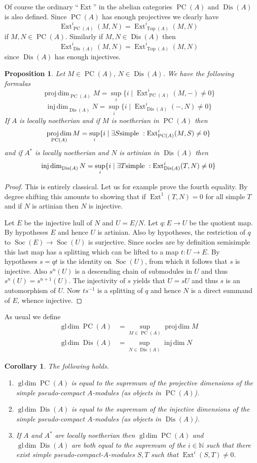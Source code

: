 \documentclass{amsproc}
\def \NN{{\mathbb N}}
\DeclareMathOperator{\Dis}{Dis}
\def\Ext{\operatorname {Ext}}
\def\gldim{\operatorname {gl\,dim}}
\def\injdim{\operatorname {inj\,dim}}
\def\r{\rightarrow}
\let\oldtext\text
\def\text#1{\oldtext{\upshape #1}}
\DeclareMathOperator{\PC}{PC}
\DeclareMathOperator{\Top}{Top}
\DeclareMathOperator{\projdim}{proj\,dim}
\DeclareMathOperator{\Soc}{Soc}
\newtheorem{proposition}[lemma]{Proposition}
\newtheorem{corollary}[lemma]{Corollary}
\theoremstyle{definition}
\theoremstyle{remark}
\numberwithin{equation}{section}
\numberwithin{table}{section}
\numberwithin{figure}{section}
\begin{document}
Of course the ordinary ``$\Ext$'' in the abelian categories $\PC(A)$
and $\Dis(A)$ is also defined. 
 Since $\PC(A)$ has enough projectives we
clearly have
\[
\Ext^i_{\PC(A)}(M,N)=\Ext^i_{\Top(A)}(M,N)
\]
if $M,N\in \PC(A)$. Similarly if $M,N\in \Dis(A)$ then 
\[
\Ext^i_{\Dis(A)}(M,N)=\Ext^i_{\Top(A)}(M,N)
\]
since $\Dis(A)$ has enough injectives.
\begin{proposition}
\label{ref:4.6b}
Let $M\in\PC(A)$, $N\in \Dis(A)$. We have the following formulas
\[
\label{ref:4.6c}
\projdim_{\PC(A)} M=\sup_i \{i\mid\Ext^i_{\PC(A)}(M,-)\neq 0\}
\]
\[
\label{ref:4.6d}
\injdim_{\Dis(A)} N=\sup_i \{i\mid\Ext^i_{\Dis(A)}(-,N)\neq 0\}
\]
If $A$ is locally noetherian and if $M$ is noetherian in $\PC(A)$ then
\[
\label{ref:4.6e}
\projdim_{\PC(A)} M=\sup_i\{i\mid \exists S\text{ simple }: \Ext^i_{\PC(A)}(M,S)\neq 0\}
\]
and if $A^\ast$ is locally noetherian and $N$ is artinian in $\Dis(A)$ then
\[
\label{ref:4.6f}
\injdim_{\Dis(A)} N=\sup_i\{i\mid \exists T\text{ simple }:
\Ext^i_{\Dis(A)}(T,N)\neq 0\}
\]
\end{proposition}
\begin{proof}
This is entirely classical.
 Let us for example prove the fourth equality.
By degree shifting this amounts to showing that if $\Ext^1(T,N)=0$ for
all simple $T$ and if $N$ is artinian then $N$ is injective.

Let $E$ be the injective hull of $N$ and $U=E/N$. Let $q:E\r U$ be the
quotient map.
By hypotheses $E$ and hence $U$ is artinian. Also by hypotheses, the
restriction of $q$ to 
$\Soc(E)\r \Soc(U)$ is surjective. Since socles are by definition 
semisimple this last map has
a splitting which can be lifted to a map $t:U\r E$. By hypotheses $s=qt$
is the identity on $\Soc(U)$, from which it follows that $s$ is
injective. Also $s^n(U)$ is a descending chain of submodules in $U$ and
thus $s^n(U)=s^{n+1}(U)$. The injectivity of $s$ yields that $U=sU$ and
thus $s$ is an automorphism of $U$. Now $ts^{-1}$ is a splitting of $q$
and hence $N$ is a direct summand of $E$, whence injective.
\end{proof}
As usual we define
\begin{align*}
\gldim \PC(A)&=\sup_{M\in \PC(A)} \projdim M\\
\gldim \Dis(A)&=\sup_{N\in \Dis(A)}\injdim N
\end{align*}
\begin{corollary}
\label{ref:4.7b}
The following holds.
\begin{enumerate}
\item $\gldim \PC(A)$ is equal to the supremum of the projective
dimensions of the simple pseudo-compact $A$-modules 
(as objects in $\PC(A)$).
\item $\gldim \Dis(A)$ is equal to the supremum of the injective
dimensions of the simple pseudo-compact $A$-modules 
(as objects in $\Dis(A)$).
\item If $A$ and $A^\ast$ are locally noetherian then 
$\gldim \PC(A)$ and $\gldim \Dis(A)$ are both equal to the supremum of the
$i\in\NN$ such that there exist simple pseudo-compact-$A$-modules 
$S,T$ such that $\Ext^i(S,T)\neq 0$.
\end{enumerate}
\end{corollary}
\end{document}
